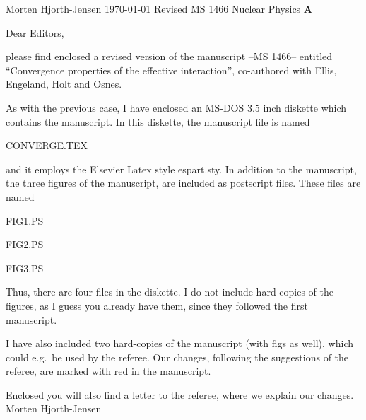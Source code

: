 
\setlength{\parindent}{0cm} 
\setlength{\parskip}{2.0ex} 
\setlength{\parsep}{0ex} 
\pagestyle{empty}
\uioENGhead%
{Morten Hjorth-Jensen}             %
{\today}                          %
{ }                               %
{ }                               %
{Revised MS 1466}                               %
\sadr%
{Nuclear Physics {\bf A}}                               %
{}                               %
{  }                               %
{}
{}
{ }                               %
\header{10mm}{             }{10mm}%
\uiologo                          %

Dear Editors,

please find enclosed a revised version of the
manuscript --MS 1466-- entitled 
``Convergence properties of the effective interaction'', 
co-authored with Ellis, Engeland, Holt and Osnes.

As with the previous case,
I have enclosed an MS-DOS 3.5 inch diskette which contains the manuscript.
In this diskette, the manuscript file is named \newline
\begin{center}CONVERGE.TEX\end{center}
and it employs the Elsevier Latex style espart.sty. 
In addition to the manuscript,
the three figures of the manuscript, are included as postscript files. These
files are named
\begin{center}FIG1.PS\end{center}
\begin{center}FIG2.PS\end{center}
\begin{center}FIG3.PS\end{center}
Thus, there are four files in the diskette. 
I do not include hard copies of the figures, as I guess you already 
have them, since they followed the first manuscript.

I have also included 
two hard-copies of the manuscript (with figs as well), 
which could e.g.\ be used by the referee. Our changes, following the
suggestions of the referee, are marked with red in the manuscript.

Enclosed you will also find a letter to the referee, where we explain
our changes.
{Morten Hjorth-Jensen}                    %
{ }         







